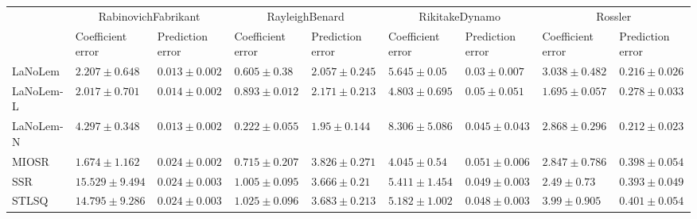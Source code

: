 \begin{table*}
{\begin{tabular}{lllllllll}
 & \multicolumn{2}{c}{RabinovichFabrikant} & \multicolumn{2}{c}{RayleighBenard} & \multicolumn{2}{c}{RikitakeDynamo} & \multicolumn{2}{c}{Rossler} \\
 & Coefficient error & Prediction error & Coefficient error & Prediction error & Coefficient error & Prediction error & Coefficient error & Prediction error \\
\midrule
LaNoLem & $2.207\pm 0.648$ & $0.013\pm 0.002$ & $0.605\pm 0.38$ & $2.057\pm 0.245$ & $5.645\pm 0.05$ & $\mathbf{0.03}\pm 0.007$ & $3.038\pm 0.482$ & $0.216\pm 0.026$ \\
LaNoLem-L & $2.017\pm 0.701$ & $0.014\pm 0.002$ & $0.893\pm 0.012$ & $2.171\pm 0.213$ & $4.803\pm 0.695$ & $0.05\pm 0.051$ & $\mathbf{1.695}\pm 0.057$ & $0.278\pm 0.033$ \\
LaNoLem-N & $4.297\pm 0.348$ & $\mathbf{0.013}\pm 0.002$ & $\mathbf{0.222}\pm 0.055$ & $\mathbf{1.95}\pm 0.144$ & $8.306\pm 5.086$ & $0.045\pm 0.043$ & $2.868\pm 0.296$ & $\mathbf{0.212}\pm 0.023$ \\
MIOSR & $\mathbf{1.674}\pm 1.162$ & $0.024\pm 0.002$ & $0.715\pm 0.207$ & $3.826\pm 0.271$ & $\mathbf{4.045}\pm 0.54$ & $0.051\pm 0.006$ & $2.847\pm 0.786$ & $0.398\pm 0.054$ \\
SSR & $15.529\pm 9.494$ & $0.024\pm 0.003$ & $1.005\pm 0.095$ & $3.666\pm 0.21$ & $5.411\pm 1.454$ & $0.049\pm 0.003$ & $2.49\pm 0.73$ & $0.393\pm 0.049$ \\
STLSQ & $14.795\pm 9.286$ & $0.024\pm 0.003$ & $1.025\pm 0.096$ & $3.683\pm 0.213$ & $5.182\pm 1.002$ & $0.048\pm 0.003$ & $3.99\pm 0.905$ & $0.401\pm 0.054$ \\

\midrule


\end{tabular}}
\end{table*}
